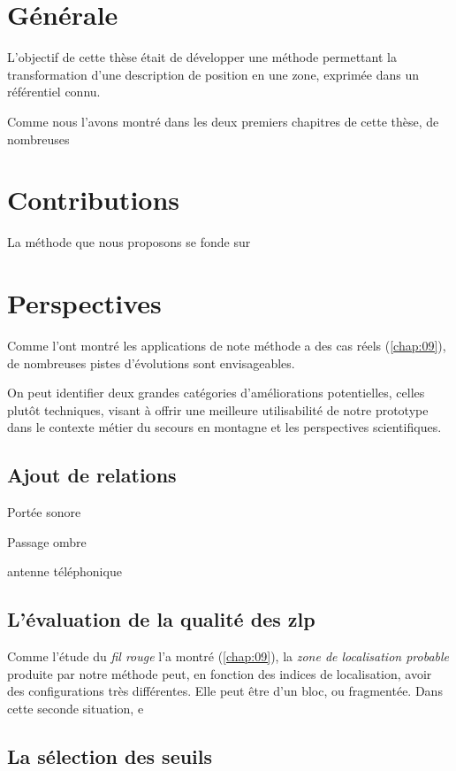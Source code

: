 \section{Générale}

L'objectif de cette thèse était de développer une méthode permettant
la transformation d'une description de position en une zone, exprimée
dans un référentiel connu.


Comme nous l'avons montré dans les deux premiers chapitres de cette
thèse, de nombreuses

\section{Contributions}

La méthode que nous proposons se fonde sur 

\section{Perspectives}

Comme l'ont montré les applications de note méthode a des cas réels
(\autoref{chap:09}), de nombreuses pistes d'évolutions sont
envisageables.

On peut identifier deux grandes catégories d'améliorations
potentielles, celles plutôt techniques, visant à offrir une meilleure
utilisabilité de notre prototype dans le contexte métier du secours en
montagne et les perspectives scientifiques.

\subsection{Ajout de relations}

Portée sonore

Passage ombre

antenne téléphonique

\subsection{L'évaluation de la qualité des \ac{zlp}}

Comme l'étude du \emph{fil rouge} l'a montré (\autoref{chap:09}), la
\emph{zone de localisation probable} produite par notre méthode peut,
en fonction des indices de localisation, avoir des configurations très
différentes. Elle peut être d'un bloc, ou fragmentée. Dans cette
seconde situation,  e

\subsection{La sélection des seuils}

